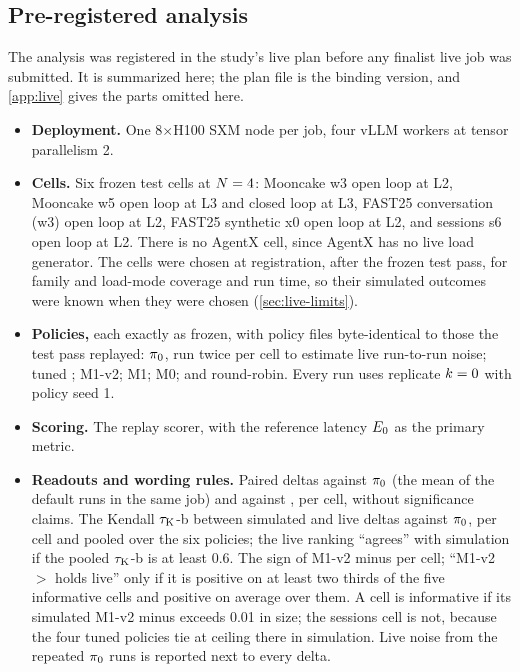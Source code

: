\subsection{Pre-registered analysis}
\label{sec:live-plan}

The analysis was registered in the study's live plan before any finalist live job was submitted. It
is summarized here; the plan file is the binding version, and \cref{app:live} gives the parts
omitted here.
\begin{itemize}
  \item \textbf{Deployment.} One 8$\times$H100 SXM node per job, four vLLM workers at tensor
    parallelism 2.
  \item \textbf{Cells.} Six frozen test cells at $N = 4$: Mooncake w3 open loop at L2, Mooncake w5
    open loop at L3 and closed loop at L3, FAST25 conversation (w3) open loop at L2, FAST25 synthetic
    x0 open loop at L2, and sessions s6 open loop at L2. There is no AgentX cell, since AgentX has no
    live load generator. The cells were chosen at registration, after the frozen test pass, for
    family and load-mode coverage and run time, so their simulated outcomes were known when they were
    chosen (\cref{sec:live-limits}).
  \item \textbf{Policies,} each exactly as frozen, with policy files byte-identical to those the
    test pass replayed: $\pi_{0}$, run twice per cell to estimate live run-to-run noise; tuned
    ; M1-v2; M1; M0; and round-robin. Every run uses replicate $k = 0$ with policy
    seed 1.
  \item \textbf{Scoring.} The replay scorer, with the \ais{} reference latency $E_0$ as the
    primary metric.
  \item \textbf{Readouts and wording rules.} Paired deltas against $\pi_{0}$ (the mean of the default
    runs in the same job) and against , per cell, without significance claims. The
    Kendall $\tau_{\mathrm{K}}$-b between simulated and live deltas against $\pi_{0}$, per cell and pooled over
    the six policies; the live ranking ``agrees'' with simulation if the pooled $\tau_{\mathrm{K}}$-b is at
    least 0.6. The sign of M1-v2 minus  per cell; ``M1-v2 $>$  holds
    live'' only if it is positive on at least two thirds of the five informative cells and positive
    on average over them. A cell is informative if its simulated M1-v2 minus  exceeds
    0.01 in size; the sessions cell is not, because the four tuned policies tie at ceiling there in
    simulation. Live noise from the repeated $\pi_{0}$ runs is reported next to every delta.
\end{itemize}


